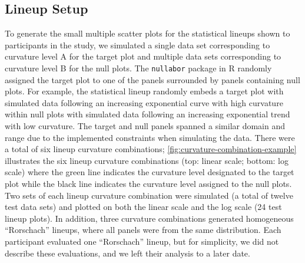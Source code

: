 \documentclass[12pt]{article}
\begin{document}
\hypertarget{lineup-setup}{%
\subsection{Lineup Setup}\label{lineup-setup}}

To generate the small multiple scatter plots for the statistical lineups
shown to participants in the study, we simulated a single data set
corresponding to curvature level A for the target plot and multiple data
sets corresponding to curvature level B for the null plots. The
\texttt{nullabor} package in R \citep{buja_statistical_2009} randomly
assigned the target plot to one of the panels surrounded by panels
containing null plots. For example, the statistical lineup randomly
embeds a target plot with simulated data following an increasing
exponential curve with high curvature within null plots with simulated
data following an increasing exponential trend with low curvature. The
target and null panels spanned a similar domain and range due to the
implemented constraints when simulating the data. There were a total of
six lineup curvature combinations;
\cref{fig:curvature-combination-example} illustrates the six lineup
curvature combinations (top: linear scale; bottom: log scale) where the
green line indicates the curvature level designated to the target plot
while the black line indicates the curvature level assigned to the null
plots. Two sets of each lineup curvature combination were simulated (a
total of twelve test data sets) and plotted on both the linear scale and
the log scale (24 test lineup plots). In addition, three curvature
combinations generated homogeneous ``Rorschach'' lineups, where all
panels were from the same distribution. Each participant evaluated one
``Rorschach'' lineup, but for simplicity, we did not describe these
evaluations, and we left their analysis to a later date.
\end{document}
